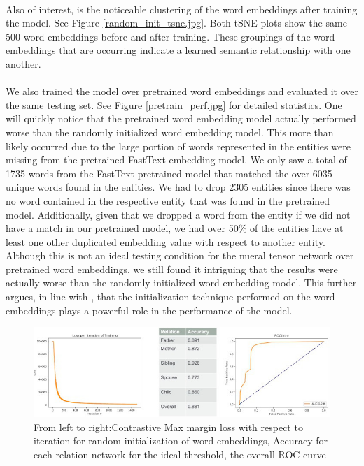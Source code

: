 \documentclass[11.5pt]{article}
\newcounter{Figure}
\newcounter{graphics}
\begin{document}
\paragraph{} Also of interest, is the noticeable clustering of the word embeddings after training the model. See Figure \ref{random_init_tsne.jpg}. Both tSNE plots show the same 500 word embeddings before and after training. These groupings of the word embeddings that are occurring indicate a learned semantic relationship with one another.

\paragraph{} We also trained the model over pretrained word embeddings and evaluated it over the same testing set. See Figure \ref{pretrain_perf.jpg} for detailed statistics. One will quickly notice that the pretrained word embedding model actually performed worse than the randomly initialized word embedding model. This more than likely occurred due to the large portion of words represented in the entities were missing from the pretrained FastText embedding model. We only saw a total of 1735 words from the FastText pretrained model that matched the over 6035 unique words found in the entities. We had to drop 2305 entities since there was no word contained in the respective entity that was found in the pretrained model. Additionally, given that we dropped a word from the entity if we did not have a match in our pretrained model, we had over 50\% of the entities have at least one other duplicated embedding value with respect to another entity. Although this is not an ideal testing condition for the nueral tensor network over pretrained word embeddings, we still found it intriguing that the results were actually worse than the randomly initialized word embedding model. This further argues, in line with \cite{socher2013reasoning}, that the initialization technique performed on the word embeddings plays a powerful role in the performance of the model.


\begin{figure}[h!]
\centerline{\includegraphics[width=1\textwidth]{report_ntn/performanceRandomNtn.jpg}}
  \caption{From left to right:Contrastive Max margin loss with respect to iteration for random initialization of word embeddings, Accuracy for each relation network for the ideal threshold, the overall ROC curve}
\label{performanceRandomNtn.jpg}
\end{figure}
\end{document}
